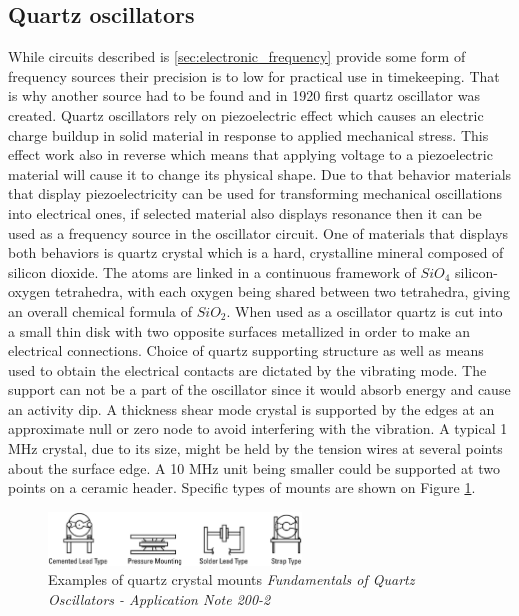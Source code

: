 \subsection{Quartz oscillators}
While circuits described is \ref{sec:electronic_frequency} provide some form of frequency sources
their precision is to low for practical use in timekeeping. 
That is why another source had to be found and in 1920 first quartz oscillator was created.
Quartz oscillators rely on piezoelectric effect which causes an electric charge buildup in 
solid material in response to applied mechanical stress. This effect work also in reverse which
means that applying voltage to a piezoelectric material will cause it to change its physical
shape. Due to that behavior materials that display piezoelectricity can be used for transforming
mechanical oscillations into electrical ones, if selected material also displays resonance then
it can be used as a frequency source in the oscillator circuit.
One of materials that displays both behaviors is quartz crystal which is a hard, crystalline 
mineral composed of silicon dioxide. 
The atoms are linked in a continuous framework of $SiO_{4}$ silicon-oxygen tetrahedra,
with each oxygen being shared between two tetrahedra, giving an overall chemical formula 
of $SiO_{2}$.
When used as a oscillator quartz is cut into a small thin disk with two opposite surfaces 
metallized in order to make an electrical connections.
Choice of quartz supporting structure as well as means used to obtain the electrical contacts 
are dictated by the vibrating mode. The support can not be a part of the oscillator since it 
would absorb energy and cause an activity dip. A thickness shear mode crystal is supported by
the edges at an approximate null or zero node to avoid interfering with the vibration.
A typical 1 MHz crystal, due to its size, might be held by the tension wires at several points
about the surface edge. A 10 MHz unit being smaller could be supported at two points on 
a ceramic header. Specific types of mounts are shown on Figure \ref{fig:quartz_mount}.
\begin{figure}[htb] 
	\label{fig:quartz_mount}
	\centering
	\includegraphics[width=0.6\textwidth]{figures/quartz_mounts}
	\caption{Examples of quartz crystal mounts \textit{Fundamentals  of 
	Quartz  Oscillators - Application  Note  200-2}}
\end{figure}
